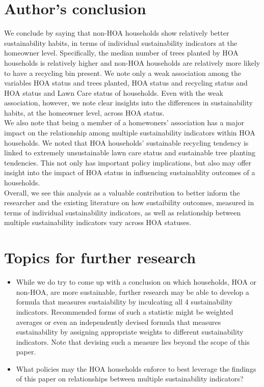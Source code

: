 \documentclass{article}
\begin{document}
\section*{Author's conclusion}

We conclude by saying that non-HOA households show relatively better sustainability habits, in terms of individual sustainability indicators at the homeowner level. Specifically, the median number of trees planted by HOA households is relatively higher and non-HOA households are relatively more likely to have a recycling bin present. We note only a weak association among the variables HOA status and trees planted, HOA status and recycling status and HOA status and Lawn Care status of households. Even with the weak association, however, we note clear insights into the differences in sustainability habits, at the homeowner level, across HOA status.\\

We also note that being a member of a homewoners' association has a major impact on the relationship among multiple sustainability indicators within HOA households. We noted that HOA households' sustainable recycling tendency is linked to extremely unsustainable lawn care status and sustainable tree planting tendencies. This not only has important policy implications, but also may offer insight into the impact of HOA status in influencing sustainablity outcomes of a households.\\

Overall, we see this analysis as a valuable contribution to better inform the researcher and the existing literature on how sustaibility outcomes, measured in terms of individual sustainability indicators, as well as relationship between multiple sustainability indicators vary across HOA statuses.\\

\section*{Topics for further research}

\begin{itemize}

\item While we do try to come up with a conclusion on which households, HOA or non-HOA, are more sustainable, further research may be able to develop a formula that measures sustaiability by inculcating all 4 sustainability indicators. Recommended forms of such a statistic might be weighted averages or even an independently devised formula that measures sustainability by assigning appropriate weights to different sustainability indicators. Note that devising such a measure lies beyond the scope of this paper.

\item What policies may the HOA households enforce to best leverage the findings of this paper on relationships between multiple sustainability indicators? 

\end{itemize}
\end{document}
